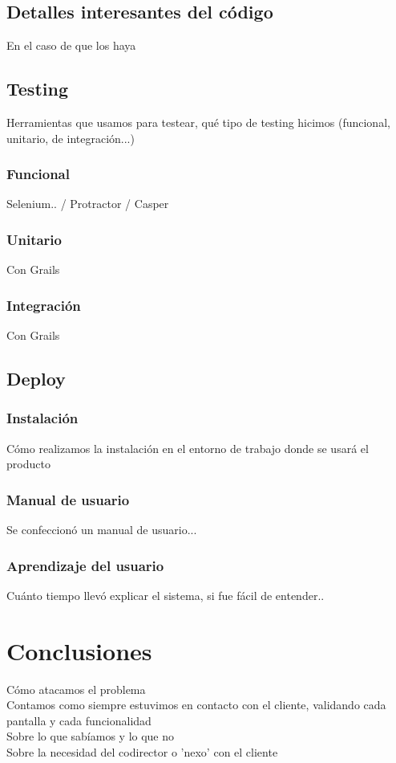 \documentclass[a4paper,10pt]{article}
\begin{document}
\subsection{Detalles interesantes del código}
En el caso de que los haya 




\subsection{Testing}
Herramientas que usamos para testear, qué tipo de testing hicimos (funcional, unitario, de integración...)
\subsubsection{Funcional}
Selenium.. / Protractor / Casper
\subsubsection{Unitario}
Con Grails
\subsubsection{Integración}
Con Grails
\subsection{Deploy}
\subsubsection{Instalación}
Cómo realizamos la instalación en el entorno de trabajo donde se usará el producto
\subsubsection{Manual de usuario}
Se confeccionó un manual de usuario...
\subsubsection{Aprendizaje del usuario}
Cuánto tiempo llevó explicar el sistema, si fue fácil de entender..

\newpage 
\section{Conclusiones}
Cómo atacamos el problema\\
Contamos como siempre estuvimos en contacto con el cliente, validando cada pantalla y cada funcionalidad\\
Sobre lo que sabíamos y lo que no\\
Sobre la necesidad del codirector o 'nexo' con el cliente
\end{document}
